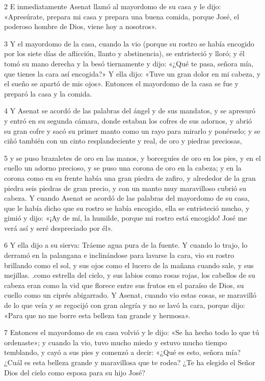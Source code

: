 \par 2 E inmediatamente Asenat llamó al mayordomo de su casa y le dijo: «Apresúrate, prepara mi casa y prepara una buena comida, porque José, el poderoso hombre de Dios, viene hoy a nosotros».

\par 3 Y el mayordomo de la casa, cuando la vio (porque su rostro se había encogido por los siete días de aflicción, llanto y abstinencia), se entristeció y lloró; y él tomó su mano derecha y la besó tiernamente y dijo: «¿Qué te pasa, señora mía, que tienes la cara así encogida?» Y ella dijo: «Tuve un gran dolor en mi cabeza, y el sueño se apartó de mis ojos». Entonces el mayordomo de la casa se fue y preparó la casa y la comida.

\par 4 Y Asenat se acordó de las palabras del ángel y de sus mandatos, y se apresuró y entró en su segunda cámara, donde estaban los cofres de sus adornos, y abrió su gran cofre y sacó su primer manto como un rayo para mirarlo y ponérselo; y se ciñó también con un cinto resplandeciente y real, de oro y piedras preciosas,

\par 5 y se puso brazaletes de oro en las manos, y borceguíes de oro en los pies, y en el cuello un adorno precioso, y se puso una corona de oro en la cabeza; y en la corona como en su frente había una gran piedra de zafiro, y alrededor de la gran piedra seis piedras de gran precio, y con un manto muy maravilloso cubrió su cabeza. Y cuando Asenat se acordó de las palabras del mayordomo de su casa, que le había dicho que su rostro se había encogido, ella se entristeció mucho, y gimió y dijo: «¡Ay de mí, la humilde, porque mi rostro está encogido! José me verá así y seré despreciado por él».

\par 6 Y ella dijo a su sierva: Tráeme agua pura de la fuente. Y cuando lo trajo, lo derramó en la palangana e inclinándose para lavarse la cara, vio su rostro brillando como el sol, y sus ojos como el lucero de la mañana cuando sale, y sus mejillas. .como estrella del cielo, y sus labios como rosas rojas, los cabellos de su cabeza eran como la vid que florece entre sus frutos en el paraíso de Dios, su cuello como un ciprés abigarrado. Y Asenat, cuando vio estas cosas, se maravilló de lo que veía y se regocijó con gran alegría y no se lavó la cara, porque dijo: «Para que no me borre esta belleza tan grande y hermosa».

\par 7 Entonces el mayordomo de su casa volvió y le dijo: «Se ha hecho todo lo que tú ordenaste»; y cuando la vio, tuvo mucho miedo y estuvo mucho tiempo temblando, y cayó a sus pies y comenzó a decir: «¿Qué es esto, señora mía? ¿Cuál es esta belleza grande y maravillosa que te rodea? ¿Te ha elegido el Señor Dios del cielo como esposa para su hijo José?

